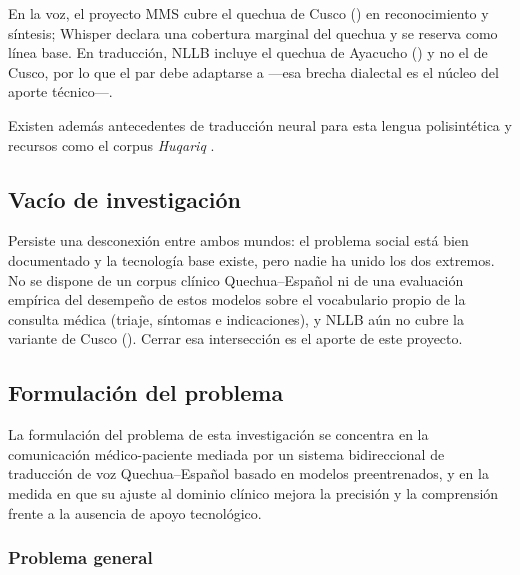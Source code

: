 En la voz, el proyecto MMS \parencite{pratap2024mms} cubre el quechua de Cusco
() en reconocimiento y s{\'i}ntesis; Whisper \parencite{radford2023whisper} declara una
cobertura marginal del quechua y se reserva como l{\'i}nea base. En traducci{\'o}n, NLLB
\parencite{costajussa2022nllb} incluye el quechua de Ayacucho () y no el de Cusco, por lo
que el par debe adaptarse a  ---esa brecha dialectal es el n{\'u}cleo del aporte
t{\'e}cnico---.

Existen adem{\'a}s antecedentes de traducci{\'o}n neural para esta lengua
polisint{\'e}tica \parencite{ortega2020quechua,mager2021americasnlp} y recursos como el corpus
\emph{Huqariq} \parencite{zevallos2022huqariq}.

\subsection{Vac{\'i}o de investigaci{\'o}n}
Persiste una desconexi{\'o}n entre ambos mundos: el problema social est{\'a} bien documentado y la
tecnolog{\'i}a base existe, pero nadie ha unido los dos extremos. No se dispone de un corpus
cl{\'i}nico Quechua--Espa{\~n}ol ni de una evaluaci{\'o}n emp{\'i}rica del desempe{\~n}o de estos
modelos sobre el vocabulario propio de la consulta m{\'e}dica (triaje, s{\'i}ntomas e indicaciones),
y NLLB a{\'u}n no cubre la variante de Cusco (). Cerrar esa intersecci{\'o}n es el aporte
de este proyecto.

\subsection{Formulaci{\'o}n del problema}
La formulaci{\'o}n del problema de esta investigaci{\'o}n se concentra en la comunicaci{\'o}n
m{\'e}dico-paciente mediada por un sistema bidireccional de traducci{\'o}n de voz Quechua--Espa{\~n}ol
basado en modelos preentrenados, y en la medida en que su ajuste al dominio cl{\'i}nico mejora la
precisi{\'o}n y la comprensi{\'o}n frente a la ausencia de apoyo tecnol{\'o}gico.

\subsubsection{Problema general}
{\textquestiondown}

